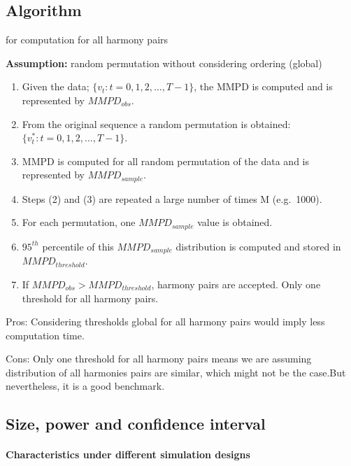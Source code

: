 \documentclass[
]{article}
\begin{document}
\hypertarget{algorithm-1}{%
\subsection{Algorithm}\label{algorithm-1}}

for computation for all harmony pairs

\textbf{Assumption:} random permutation without considering ordering
(global)

\begin{enumerate}
\def\labelenumi{\arabic{enumi}.}
\item
  Given the data; \(\{v_t: t=0, 1, 2, \dots, T-1\}\), the MMPD is computed and is represented by \(MMPD_{obs}\).
\item
  From the original sequence a random permutation is obtained: \(\{v_t^*: t=0, 1, 2, \dots, T-1\}\).
\item
  MMPD is computed for all random permutation of the data and is represented by \(MMPD_{sample}\).
\item
  Steps (2) and (3) are repeated a large number
  of times M (e.g.~1000).
\item
  For each permutation, one \(MMPD_{sample}\) value is obtained.
\item
  \(95^{th}\) percentile of this \(MMPD_{sample}\) distribution is computed and stored in \(MMPD_{threshold}\).
\item
  If \(MMPD_{obs}> MMPD_{threshold}\), harmony pairs are accepted. Only one threshold for all harmony pairs.
\end{enumerate}

Pros: Considering thresholds global for all harmony pairs would imply less computation time.

Cons: Only one threshold for all harmony pairs means we are assuming distribution of all harmonies pairs are similar, which might not be the case.But nevertheless, it is a good benchmark.

\hypertarget{size-power-and-confidence-interval}{%
\subsection{Size, power and confidence interval}\label{size-power-and-confidence-interval}}

\hypertarget{characteristics-under-different-simulation-designs}{%
\paragraph{Characteristics under different simulation designs}\label{characteristics-under-different-simulation-designs}}
\end{document}
